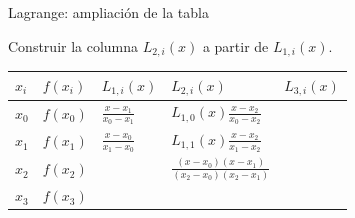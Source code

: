 \documentclass[main.tex]{subfiles}
\begin{document}
\begin{frame}[t]{Lagrange: ampliación de la tabla}
\par\noindent\begin{minipage}[t][10mm][t]{\textwidth}\small\strut Construir la columna $L_{2,i}(x)$ a partir de $L_{1,i}(x)$.\end{minipage}\par\nointerlineskip
\begin{minipage}[t]{\textwidth}\begingroup\scriptsize\setlength{\tabcolsep}{3pt}\begin{center}\begin{tabular}{|C{.065\textwidth}|C{.095\textwidth}|C{.19\textwidth}|C{.25\textwidth}|C{.25\textwidth}|}\hline
\rule[-2mm]{0pt}{6mm}$x_i$&$f(x_i)$&$L_{1,i}(x)$&$L_{2,i}(x)$&$L_{3,i}(x)$\\\hline
\rule[-2.5mm]{0pt}{8mm}$x_0$&$f(x_0)$&$\frac{x-x_1}{x_0-x_1}$&$L_{1,0}(x)\frac{x-x_2}{x_0-x_2}$&\\\hline
\rule[-2.5mm]{0pt}{8mm}$x_1$&$f(x_1)$&$\frac{x-x_0}{x_1-x_0}$&$L_{1,1}(x)\frac{x-x_2}{x_1-x_2}$&\\\hline
\rule[-2.5mm]{0pt}{8mm}$x_2$&$f(x_2)$&&$\frac{(x-x_0)(x-x_1)}{(x_2-x_0)(x_2-x_1)}$&\\\hline
\rule[-2.5mm]{0pt}{8mm}$x_3$&$f(x_3)$&&&\\\hline
\end{tabular}\end{center}\endgroup\par
\end{minipage}\par
\end{frame}
\end{document}

